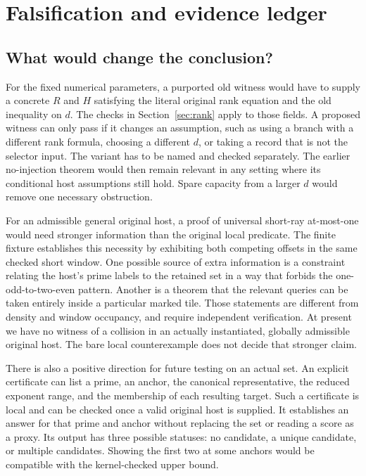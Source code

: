 \documentclass[12pt,letterpaper]{article}
\begin{document}
\section{Falsification and evidence ledger}

\subsection{What would change the conclusion?}

For the fixed numerical parameters, a purported old witness would have to supply a concrete $R$ and $H$ satisfying the literal original rank equation and the old inequality on $d$. The checks in Section~\ref{sec:rank} apply to those fields. A proposed witness can only pass if it changes an assumption, such as using a branch with a different rank formula, choosing a different $d$, or taking a record that is not the selector input. The variant has to be named and checked separately. The earlier no-injection theorem would then remain relevant in any setting where its conditional host assumptions still hold. Spare capacity from a larger $d$ would remove one necessary obstruction.

For an admissible general original host, a proof of universal short-ray at-most-one would need stronger information than the original local predicate. The finite fixture establishes this necessity by exhibiting both competing offsets in the same checked short window. One possible source of extra information is a constraint relating the host's prime labels to the retained set in a way that forbids the one-odd-to-two-even pattern. Another is a theorem that the relevant queries can be taken entirely inside a particular marked tile. Those statements are different from density and window occupancy, and require independent verification. At present we have no witness of a collision in an actually instantiated, globally admissible original host. The bare local counterexample does not decide that stronger claim.

There is also a positive direction for future testing on an actual set. An explicit certificate can list a prime, an anchor, the canonical representative, the reduced exponent range, and the membership of each resulting target. Such a certificate is local and can be checked once a valid original host is supplied. It establishes an answer for that prime and anchor without replacing the set or reading a score as a proxy. Its output has three possible statuses: no candidate, a unique candidate, or multiple candidates. Showing the first two at some anchors would be compatible with the kernel-checked upper bound.
\end{document}
